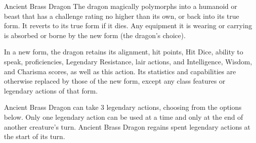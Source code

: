 \documentclass[10pt,a4paper,twoside,twocolumn,openany,nodeprecatedcode]{dndbook}
\begin{document}
\begin{DndMonster}[float=ht]{Ancient Brass Dragon}
The dragon magically polymorphs into a humanoid or beast that has a challenge rating no higher than its own, or back into its true form. It reverts to its true form if it dies. Any equipment it is wearing or carrying is absorbed or borne by the new form (the dragon's choice).

In a new form, the dragon retains its alignment, hit points, Hit Dice, ability to speak, proficiencies, Legendary Resistance, lair actions, and Intelligence, Wisdom, and Charisma scores, as well as this action. Its statistics and capabilities are otherwise replaced by those of the new form, except any class features or legendary actions of that form.

\par
{}
Ancient Brass Dragon can take 3 legendary actions, choosing from the options below. Only one legendary action can be used at a time and only at the end of another creature's turn. Ancient Brass Dragon regains spent legendary actions at the start of its turn.

\begin{DndMonsterLegendaryActions}
\end{DndMonsterLegendaryActions}
\end{DndMonster}


\clearpage
{}
\end{document}
